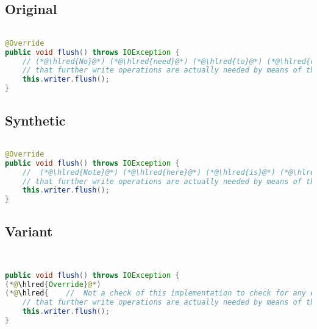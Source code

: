 \documentclass[11pt]{article}
\DeclareRobustCommand{\hlred}[1]{{\sethlcolor{YellowOrange}\hl{#1}}}
\begin{document}
\subsection{Original}
\begin{lstlisting}[language=java]

@Override
public void flush() throws IOException {
    // (*@\hlred{No}@*) (*@\hlred{need}@*) (*@\hlred{to}@*) (*@\hlred{control}@*) (*@\hlred{overflow}@*) (*@\hlred{here.}@*) (*@\hlred{The}@*) (*@\hlred{fact}@*) (*@\hlred{that}@*) (*@\hlred{this}@*) (*@\hlred{has}@*) (*@\hlred{overflow}@*) (*@\hlred{will}@*) (*@\hlred{be}@*) (*@\hlred{used}@*) (*@\hlred{as}@*) (*@\hlred{a}@*) (*@\hlred{flag}@*) to(*@\hlred{ determine}@*)
    // that further write operations are actually needed by means of the isOverflown() method.
    this.writer.flush();
}
\end{lstlisting}
\subsection{Synthetic}

\begin{lstlisting}[language=java]

@Override
public void flush() throws IOException {
    //  (*@\hlred{Note}@*) (*@\hlred{here}@*) (*@\hlred{is}@*) (*@\hlred{an}@*) (*@\hlred{exception}@*) (*@\hlred{that}@*) (*@\hlred{may}@*) (*@\hlred{result}@*) (*@\hlred{when}@*) (*@\hlred{the}@*) (*@\hlred{writer}@*) (*@\hlred{checks}@*) (*@\hlred{whether}@*) (*@\hlred{there}@*) (*@\hlred{exist}@*) (*@\hlred{problems}@*) (*@\hlred{or}@*) (*@\hlred{otherwise}@*) to
    // that further write operations are actually needed by means of the isOverflown() method.
    this.writer.flush();
}
\end{lstlisting}

\subsection{Variant}

\begin{lstlisting}[language=java]


public void flush() throws IOException {
(*@\hlred{Override}@*)
(*@\hlred{    //  Not a check of this implementation to check for any errors but also it seems useful here as to}@*)
    // that further write operations are actually needed by means of the isOverflown() method.
    this.writer.flush();
}
\end{lstlisting}
\end{document}
